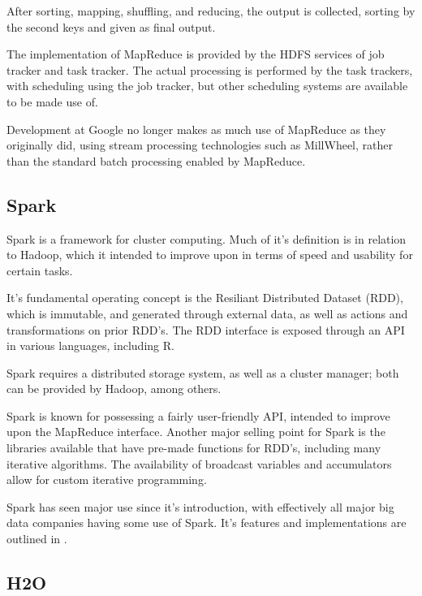 After sorting, mapping, shuffling, and reducing, the output is
collected, sorting by the second keys and given as final output.

The implementation of MapReduce is provided by the HDFS services of job
tracker and task tracker. The actual processing is performed by the task
trackers, with scheduling using the job tracker, but other scheduling
systems are available to be made use of.

Development at Google no longer makes as much use of MapReduce as they
originally did, using stream processing technologies such as MillWheel,
rather than the standard batch processing enabled by
MapReduce\cite{akidau2013millwheel}.

\hypertarget{sec:spark}{%
    \subsection{Spark}\label{sec:spark}}

Spark is a framework for cluster computing\cite{zaharia2010spark}. Much
of it's definition is in relation to Hadoop, which it intended to
improve upon in terms of speed and usability for certain tasks.

It's fundamental operating concept is the Resiliant Distributed Dataset
(RDD), which is immutable, and generated through external data, as well
as actions and transformations on prior RDD's. The RDD interface is
exposed through an API in various languages, including R.

Spark requires a distributed storage system, as well as a cluster
manager; both can be provided by Hadoop, among others.

Spark is known for possessing a fairly user-friendly API, intended to
improve upon the MapReduce interface. Another major selling point for
Spark is the libraries available that have pre-made functions for RDD's,
including many iterative algorithms. The availability of broadcast
variables and accumulators allow for custom iterative programming.

Spark has seen major use since it's introduction, with effectively all
major big data companies having some use of Spark. It's features and
implementations are outlined in \cite{zaharia2016apache}.

\hypertarget{sec:h2o}{%
    \subsection{H2O}\label{sec:h2o}}


